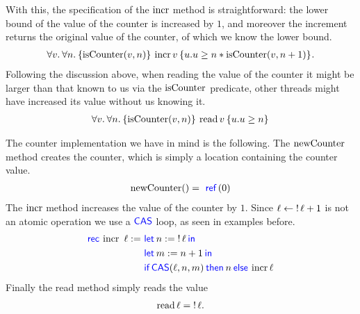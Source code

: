With this, the specification of the $\operatorname{incr}$ method is straightforward: the lower bound of the value of the counter is increased by $1$, and moreover the increment returns the original value of the counter, of which we know the lower bound.
\begin{align*}
  \All v . \All n . \hoare{\isCounter(v, n)}{\incrC v}{u.u \geq n \ast \isCounter(v, n+1)}.
\end{align*}
Following the discussion above, when reading the value of the counter it might be larger than that known to us via the $\operatorname{isCounter}$ predicate, \ie{} other threads might have increased its value without us knowing it.
\begin{align*}
  \All v . \All n . \hoare{\isCounter(v, n)}{\readC v}{u.u \geq n}
\end{align*}

The counter implementation we have in mind is the following.
The $\operatorname{newCounter}$ method creates the counter, which is simply a location containing the counter value.
\begin{align*}
  \newC \TT =\ \Ref(0)
\end{align*}
The $\operatorname{incr}$ method increases the value of the counter by $1$.
Since $\ell \leftarrow \mathop{!} \ell + 1$ is not an atomic operation we use a $\textsf{\color{blue} CAS}$ loop, as seen in examples before.
\begin{align*}
  \Rec{\incrC} \ell =\ &\Let n = \deref \ell in\\
                       &\Let m = n + 1 in\\
                       &\If \CAS(\ell, n, m) then n \Else \incrC \ell
\end{align*}
Finally the read method simply reads the value
\begin{align*}
  \operatorname{read} \ell = \mathop{!} \ell.
\end{align*}

